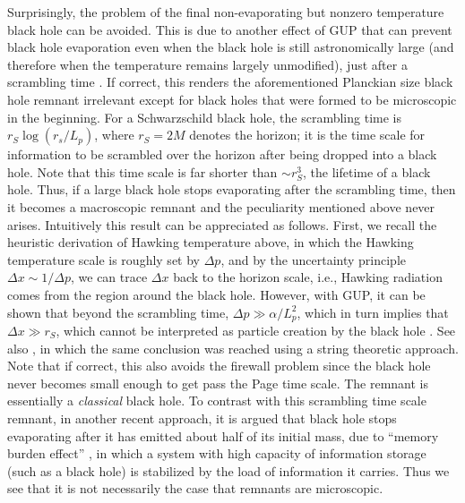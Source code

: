 \documentclass[preprintnumbers, floatfix, preprintnumbers, letterpaper, twocolumn, superscriptaddress,nofootinbib]{revtex4-2}
\begin{document}
Surprisingly, the problem of the final non-evaporating but nonzero temperature black hole can be avoided. This is due to another effect of GUP that can prevent black hole evaporation even when the black hole is still astronomically large (and therefore when the temperature remains largely unmodified), just after a scrambling time \cite{2309.01638}. If correct, this renders the aforementioned Planckian size black hole remnant irrelevant except for black holes that were formed to be microscopic in the beginning.
For a Schwarzschild black hole, the scrambling time \cite{0708.4025,0808.2096} is $r_S\log(r_s/L_p)$, where $r_S=2M$ denotes the horizon; it is the time scale for information to be scrambled over the horizon after being dropped into a black hole. Note that this time scale is far shorter than $\sim r_S^3$, the lifetime of a black hole. Thus, if a large black hole stops evaporating after the scrambling time, then it becomes a macroscopic remnant and the peculiarity mentioned above never arises. Intuitively this result can be appreciated as follows. First, we recall the heuristic derivation of Hawking temperature above, in which the Hawking temperature scale is roughly set by $\Delta p$, and by the uncertainty principle $\Delta x \sim 1/\Delta p$, we can trace $\Delta x$ back to the horizon scale, i.e., Hawking radiation comes from the region around the black hole. However, with GUP, it can be shown that beyond the scrambling time, $\Delta p \gg \alpha/L_p^2$, which in turn implies that $\Delta x \gg r_S$, which cannot be interpreted as particle creation by the black hole \cite{2309.01638}. See also \cite{2309.12926}, in which the same conclusion was reached using a string theoretic approach. Note that if correct, this also avoids the firewall problem since the black hole never becomes small enough to get pass the Page time scale. The remnant is essentially a \emph{classical} black hole. To contrast with this scrambling time scale remnant,
in another recent approach, it is argued that black hole stops evaporating after it has emitted about half of its initial mass, due to ``memory burden effect'' \cite{2405.13117}, in which a system with high capacity of information storage (such as a black hole) is stabilized by the load of information it carries. Thus we see that it is not necessarily the case that remnants are microscopic.
\end{document}
